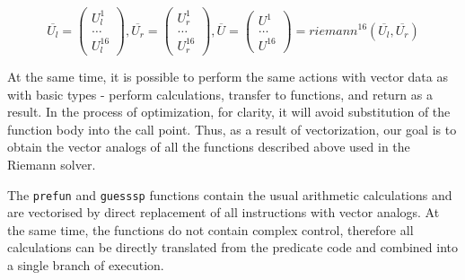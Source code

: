 \documentclass[
11pt,%
tightenlines,%
twoside,%
onecolumn,%
nofloats,%
nobibnotes,%
nofootinbib,%
superscriptaddress,%
noshowpacs,%
centertags]%
{revtex4}
\begin{document}
\begin{equation}\label{eq:riemann_16}
\overline{U_l} = \left( \begin{array}{ccc} U_l^1 \\ \ldots \\ U_l^{16} \end{array} \right),
\overline{U_r} = \left( \begin{array}{ccc} U_r^1 \\ \ldots \\ U_r^{16} \end{array} \right),
\overline{U} = \left( \begin{array}{ccc} U^1 \\ \ldots \\ U^{16} \end{array} \right) = riemann^{16}(\overline{U_l}, \overline{U_r})
\end{equation}

At the same time, it is possible to perform the same actions with vector data as with basic types - perform calculations, transfer to functions, and return as a result.
In the process of optimization, for clarity, it will avoid substitution of the function body into the call point. Thus, as a result of vectorization, our goal is to obtain the vector analogs of all the functions described above used in the Riemann solver.

The \texttt{prefun} and \texttt{guesssp} functions contain the usual arithmetic calculations and are vectorised by direct replacement of all instructions with vector analogs.
At the same time, the functions do not contain complex control, therefore all calculations can be directly translated from the predicate code and combined into a single branch of execution.
\end{document}

